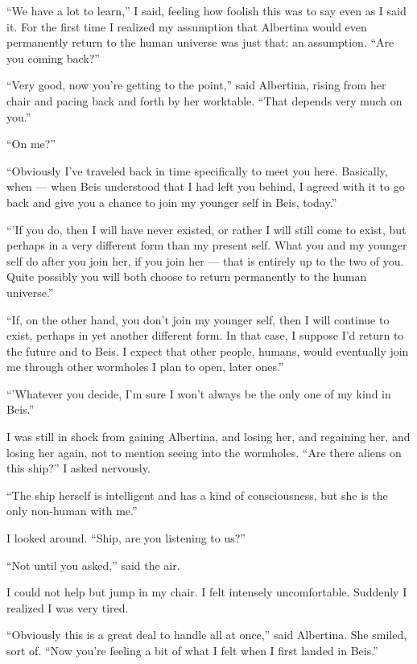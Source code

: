 \documentclass[english,11pt,letterpaper,onecolumn]{scrbook}
\begin{document}
	``We have a lot to learn,'' I said, feeling how foolish this was to say even as I said it.  For the first time I realized my assumption that Albertina would even permanently return to the human universe was just that:  an assumption.  ``Are you coming back?''

	``Very good, now you're getting to the point,'' said Albertina, rising from her chair and pacing back and forth by her worktable.  ``That depends very much on you.''

	``On me?''  

	``Obviously I've traveled back in time specifically to meet you here.  Basically, when --- when Beis understood that I had left you behind, I agreed with it to go back and give you a chance to join my younger self in Beis, today.''

  	``'If you do, then I will have never existed, or rather I will still come to exist, but perhaps in a very different form than my present self.  What you and my younger self do after you join her, if you join her --- that is entirely up to the two of you.  Quite possibly you will both choose to return permanently to the human universe.''

	``If, on the other hand, you don't join my younger self, then I will continue to exist, perhaps in yet another different form.  In that case, I suppose I'd return to the future and to Beis.  I expect that other people, humans, would eventually join me through other wormholes I plan to open, later ones.''  

	``'Whatever you decide, I'm sure I won't always be the only one of my kind in Beis.''

	I was still in shock from gaining Albertina, and losing her, and regaining her, and losing her again, not to mention seeing into the wormholes.  ``Are there aliens on this ship?'' I asked nervously.

	``The ship herself is intelligent and has a kind of consciousness, but she is the only non-human with me.''

	I looked around.  ``Ship, are you listening to us?''

	``Not until you asked,'' said the air.

	I could not help but jump in my chair.  I felt intensely uncomfortable.  Suddenly I realized I was very tired.

	``Obviously this is a great deal to handle all at once,'' said Albertina.  She smiled, sort of.  ``Now you're feeling a bit of what I felt when I first landed in Beis.''
\end{document}
